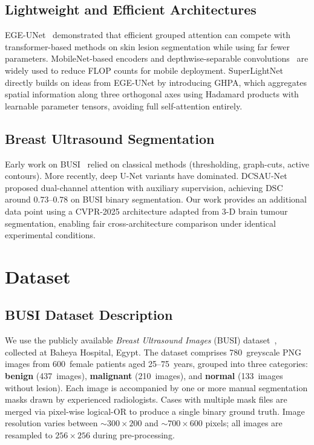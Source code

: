 \documentclass[conference]{IEEEtran}
\begin{document}
\subsection{Lightweight and Efficient Architectures}

EGE-UNet~\cite{wu2023ege} demonstrated that efficient grouped
attention can compete with transformer-based methods on skin lesion
segmentation while using far fewer parameters. MobileNet-based
encoders and depthwise-separable convolutions~\cite{howard2017mobilenets}
are widely used to reduce FLOP counts for mobile deployment.
SuperLightNet~\cite{yu2025superlightnet} directly builds on ideas
from EGE-UNet by introducing GHPA, which aggregates spatial
information along three orthogonal axes using Hadamard products with
learnable parameter tensors, avoiding full self-attention entirely.

\subsection{Breast Ultrasound Segmentation}

Early work on BUSI~\cite{al2020dataset} relied on classical methods
(thresholding, graph-cuts, active contours). More recently, deep
U-Net variants have dominated. DCSAU-Net~\cite{xu2023dcsau} proposed
dual-channel attention with auxiliary supervision, achieving DSC
around 0.73--0.78 on BUSI binary segmentation. Our work provides an
additional data point using a CVPR-2025 architecture adapted from
3-D brain tumour segmentation, enabling fair cross-architecture
comparison under identical experimental conditions.

\section{Dataset}

\subsection{BUSI Dataset Description}

We use the publicly available \textit{Breast Ultrasound Images}
(BUSI) dataset~\cite{al2020dataset}, collected at Baheya Hospital,
Egypt. The dataset comprises 780~greyscale PNG images from 600~female
patients aged 25--75~years, grouped into three categories:
\textbf{benign} (437~images), \textbf{malignant} (210~images), and
\textbf{normal} (133~images without lesion). Each image is
accompanied by one or more manual segmentation masks drawn by
experienced radiologists. Cases with multiple mask files are merged
via pixel-wise logical-OR to produce a single binary ground truth.
Image resolution varies between $\sim$$300\times200$ and
$\sim$$700\times600$ pixels; all images are resampled to
$256\times256$ during pre-processing.
\end{document}
